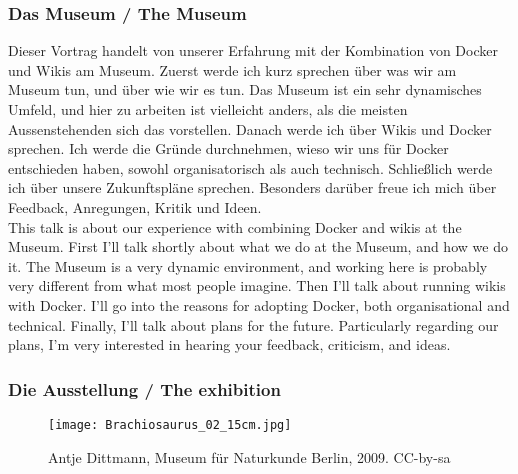 {\scriptsize
\begin{frame}
  \frametitle{Das Museum / \textcolor{mfn_green}{The Museum}}
  Dieser Vortrag handelt von unserer Erfahrung mit der Kombination von Docker und Wikis am Museum. Zuerst werde ich kurz sprechen über was wir am Museum tun, und über wie wir es tun. Das Museum ist ein sehr dynamisches Umfeld, und hier zu arbeiten ist vielleicht anders, als die meisten Aussenstehenden sich das vorstellen. Danach werde ich über Wikis und Docker sprechen. Ich werde die Gründe durchnehmen, wieso wir uns für Docker entschieden haben, sowohl organisatorisch als auch technisch. Schließlich werde ich über unsere Zukunftspläne sprechen. Besonders darüber freue ich mich über Feedback, Anregungen, Kritik und Ideen.\\
  \bigskip
  \textcolor{mfn_green}{This talk is about our experience with combining Docker and wikis at the Museum. First I'll talk shortly about what we do at the Museum, and how we do it. The Museum is a very dynamic environment, and working here is probably very different from what most people imagine. Then I'll talk about running wikis with Docker. I'll go into the reasons for adopting Docker, both organisational and technical. Finally, I'll talk about plans for the future. Particularly regarding our plans, I'm very interested in hearing your feedback, criticism, and ideas.}
\end{frame}
}
\begin{frame}
  \frametitle{Die Ausstellung / \textcolor{mfn_green}{The exhibition}}
  \begin{figure}
  \texttt{[image: Brachiosaurus\_02\_15cm.jpg]}
  \caption{\textcopyright Antje Dittmann, Museum für Naturkunde Berlin, 2009. CC-by-sa}
  \end{figure}
\end{frame}

